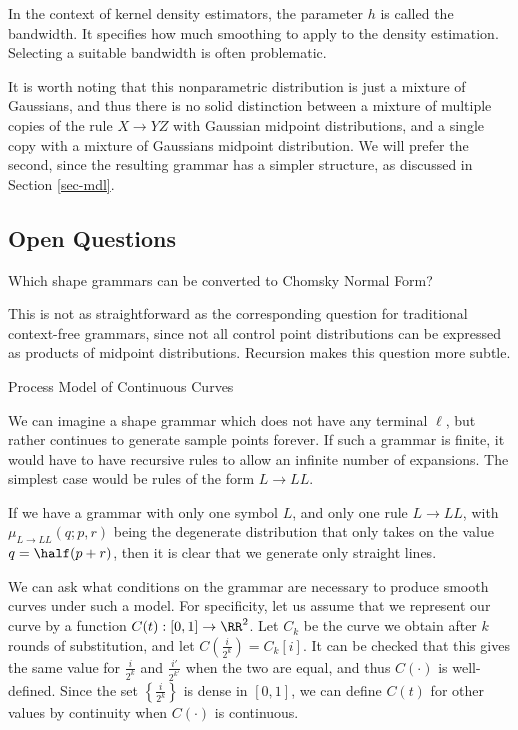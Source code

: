 In the context of kernel density estimators, the parameter $h$ is
called the bandwidth. It specifies how much smoothing to apply to the
density estimation. Selecting a suitable bandwidth is often
problematic. 

It is worth noting that this nonparametric distribution is just a
mixture of Gaussians, and thus there is no solid distinction between a
mixture of multiple copies of the rule $X\to YZ$ with Gaussian
midpoint distributions, and a single copy with a mixture of Gaussians
midpoint distribution. We will prefer the second, since the resulting
grammar has a simpler structure, as discussed in Section \ref{sec-mdl}.

\subsection{Open Questions}

Which shape grammars can be converted to Chomsky Normal Form?

This is not as straightforward as the corresponding question for
traditional context-free grammars, since not all control point
distributions can be expressed as products of midpoint
distributions. Recursion makes this question more subtle.

\newthought
Process Model of Continuous Curves

We can imagine a shape grammar which does not have any terminal
$\ell$, but rather continues to generate sample points forever. If
such a grammar is finite, it would have to have recursive rules to
allow an infinite number of expansions. The simplest case would be
rules of the form $L\to LL$.

If we have a grammar with only one symbol $L$, and only one rule $L\to
LL$, with $\mu_{L\to LL}(q;p,r)$ being the degenerate distribution
that only takes on the value $q=\half(p+r)$, then it is clear that we
generate only straight lines.

We can ask what conditions on the grammar are necessary to produce
smooth curves under such a model. For specificity, let us assume that
we represent our curve by a function $C(t) : [0,1] \to \RR^2$. Let
$C_k$ be the curve we obtain after $k$ rounds of substitution, and let
$C(\frac{i}{2^k}) = C_k[i]$. It can be checked that this gives the
same value for $\frac{i}{2^k}$ and $\frac{i'}{2^{k'}}$ when the two
are equal, and thus $C(\cdot)$ is well-defined.  Since the set
$\left\{\frac{i}{2^k}\right\}$ is dense in $[0,1]$, we can define
$C(t)$ for other values by continuity when $C(\cdot)$ is continuous.

